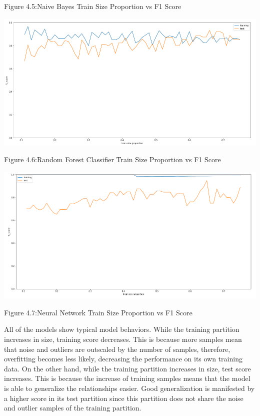 \documentclass[]{report}
\begin{document}
\begin{center} Figure 4.5:Naive Bayes Train Size Proportion vs F1 Score \end{center}

\includegraphics{images/treeCV.png}

\begin{center} Figure 4.6:Random Forest Classifier Train Size Proportion vs F1 Score \end{center}

\includegraphics{images/nnCV.png}

\begin{center} Figure 4.7:Neural Network Train Size Proportion vs F1 Score \end{center}

All of the models show typical model behaviors. While the training
partition increases in size, training score decreases. This is because
more samples mean that noise and outliers are outscaled by the number of
samples, therefore, overfitting becomes less likely, decreasing the
performance on its own training data. On the other hand, while the
training partition increases in size, test score increases. This is
because the increase of training samples means that the model is able to
generalize the relationships easier. Good generalization is manifested
by a higher score in its test partition since this partition does not
share the noise and outlier samples of the training partition.
\end{document}
